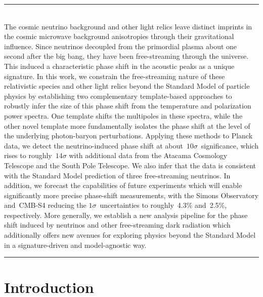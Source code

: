 \documentclass[11pt]{article}
\numberwithin{equation}{section}
\begin{document}
\begin{titlepage}
	
	\vspace{1.2cm}
	\hrule \vspace{0.3cm}
	\\[0.1cm]
	The cosmic neutrino background and other light relics leave distinct imprints in the cosmic microwave background anisotropies through their gravitational influence. Since neutrinos decoupled from the primordial plasma about one second after the big bang, they have been free-streaming through the universe. This induced a characteristic phase shift in the acoustic peaks as a unique signature. In this work, we constrain the free-streaming nature of these relativistic species and other light relics beyond the Standard Model of particle physics by establishing two complementary template-based approaches to robustly infer the size of this phase shift from the temperature and polarization power spectra. One template shifts the multipoles in these spectra, while the other novel template more fundamentally isolates the phase shift at the level of the underlying photon-baryon perturbations. Applying these methods to Planck data, we detect the neutrino-induced phase shift at about~$10\sigma$~significance, which rises to roughly~$14\sigma$ with additional data from the Atacama Cosmology Telescope and the South Pole Telescope. We also infer that the data is consistent with the Standard Model prediction of three free-streaming neutrinos. In addition, we forecast the capabilities of future experiments which will enable significantly more precise phase-shift measurements, with the Simons Observatory and~\mbox{CMB-S4} reducing the $1\sigma$~uncertainties to roughly~4.3\% and~2.5\%, respectively. More generally, we establish a new analysis pipeline for the phase shift induced by neutrinos and other free-streaming dark radiation which additionally offers new avenues for exploring physics beyond the Standard Model in a signature-driven and model-agnostic way.

	\vskip10pt
	\hrule
	\vskip10pt
\end{titlepage}


\thispagestyle{empty}
\setcounter{page}{2}
\tableofcontents


\clearpage
{}
\setcounter{page}{1}
\section{Introduction}
\label{sec:introduction}
\end{document}
